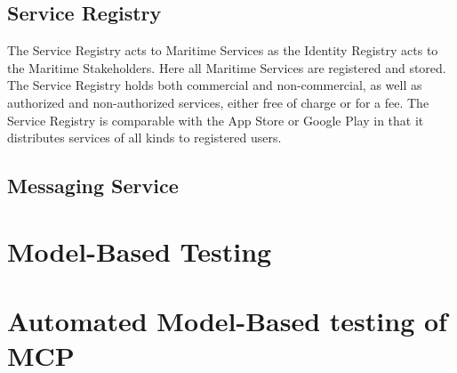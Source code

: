 \subsection{Service Registry}
The Service Registry acts to Maritime Services as the Identity Registry acts to the Maritime Stakeholders. Here all Maritime Services are registered and stored. The Service Registry holds both commercial and non-commercial, as well as authorized and non-authorized services, either free of charge or for a fee. The Service Registry is comparable with the App Store or Google Play in that it distributes services of all kinds to registered users.\cite{efficienSea2}
\subsection{Messaging Service}
\cite{efficienSea2}
\section{Model-Based Testing}

\section{Automated Model-Based testing of MCP}